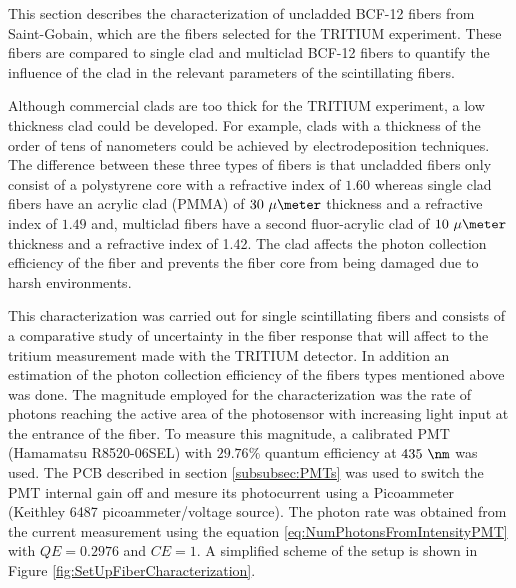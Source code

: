 This section describes the characterization of uncladded BCF-12 fibers from Saint-Gobain, which are the fibers selected for the TRITIUM experiment. These fibers are compared to single clad and multiclad BCF-12 fibers to quantify the influence of the clad in the relevant parameters of the scintillating fibers.

Although commercial clads are too thick for the TRITIUM experiment, a low thickness clad could be developed. For example, clads with a thickness of the order of tens of nanometers could be achieved by electrodeposition techniques. The difference between these three types of fibers is that uncladded fibers only consist of a polystyrene core with a refractive index of $1.60$ whereas single clad fibers have an acrylic clad (PMMA) of $30~\mu\meter$ thickness and a refractive index of $1.49$ and, multiclad fibers have a second fluor-acrylic clad of $10~\mu\meter$ thickness  and a refractive index of 1.42. The clad affects the photon collection efficiency of the fiber and prevents the fiber core from being damaged due to harsh environments.




This characterization was carried out for single scintillating fibers and consists of a comparative study of uncertainty in the fiber response that will affect to the tritium measurement made with the TRITIUM detector. In addition an estimation of the photon collection efficiency of the fibers types mentioned above was done. The magnitude employed for the characterization was the rate of photons reaching the active area of the photosensor with increasing light input at the entrance of the fiber. To measure this magnitude, a calibrated PMT (Hamamatsu R8520-06SEL) with $29.76\%$ quantum efficiency at $435~\nm$ was used. The PCB described in section \ref{subsubsec:PMTs} was used to switch the PMT internal gain off and mesure its photocurrent using a Picoammeter (Keithley 6487 picoammeter/voltage source). The photon rate was obtained from the current measurement using the equation \ref{eq:NumPhotonsFromIntensityPMT} with $QE=0.2976$ and $CE=1$. A simplified scheme of the setup is shown in Figure \ref{fig:SetUpFiberCharacterization}.

